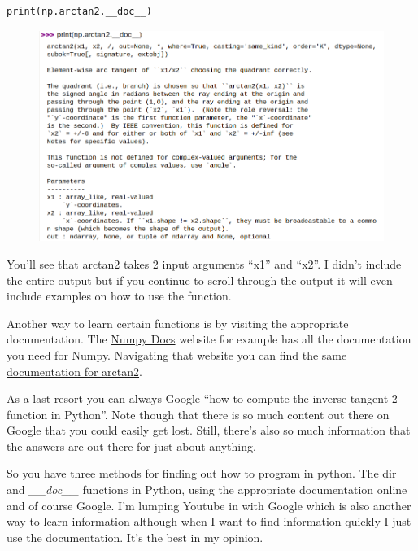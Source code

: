 \begin{verbatim}
print(np.arctan2.__doc__)
\end{verbatim}

\begin{figure}[H]
  \begin{center}
    \includegraphics[width=\textwidth]{Figures/arctan2_doc.png}
  \end{center}
\end{figure}

You’ll see that arctan2 takes 2 input arguments “x1” and “x2”. I
didn’t include the entire output but if you continue to scroll through
the output it will even include examples on how to use the function.  

Another way to learn certain functions is by visiting the appropriate
documentation. The \href{https://numpy.org/doc/}{Numpy Docs} website
for example has all the documentation you need for Numpy. Navigating
that website you can find the same \href{https://numpy.org/doc/1.19/reference/generated/numpy.arctan2.html?highlight=arctan2#numpy.arctan2}{documentation for arctan2}.

As a last resort you can always Google “how to compute the inverse
tangent 2 function in Python”. Note though that there is so much
content out there on Google that you could easily get lost. Still,
there’s also so much information that the answers are out there for
just about anything.  

So you have three methods for finding out how to program in
python. The dir and {\it \_\_doc\_\_} functions in Python, using the appropriate
documentation online and of course Google. I’m lumping Youtube in with
Google which is also another way to learn information although when I
want to find information quickly I just use the documentation. It’s
the best in my opinion. 

